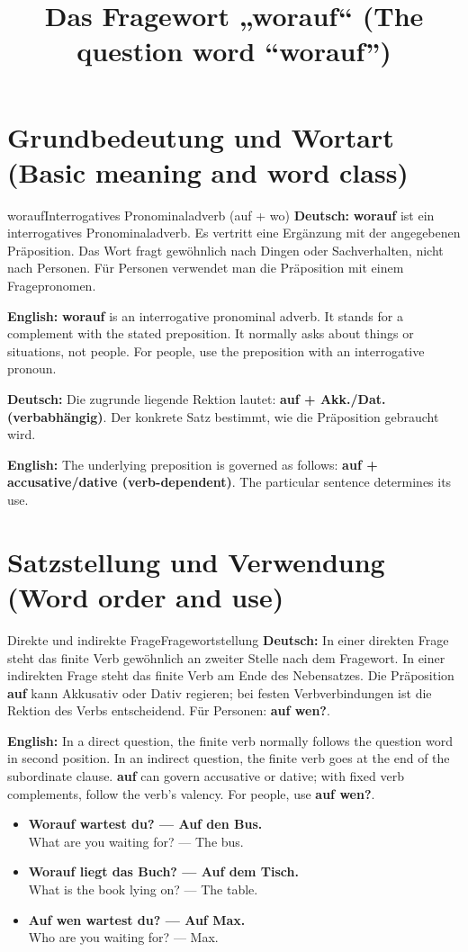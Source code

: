 \documentclass[a4paper,11pt]{article}
\title{Das Fragewort „worauf“ (The question word “worauf”)}
\date{}
\newcommand{\GermanText}[1]{\textbf{Deutsch: }#1\par}
\newcommand{\EnglishText}[1]{{\small\color{SoftGray}\textbf{English: }#1\par}}
\newcommand{\ExampleItem}[2]{\item \textbf{#1}\\{\small\color{SoftGray}#2}}
\begin{document}
\maketitle
\tableofcontents
\newpage
\section{Grundbedeutung und Wortart (Basic meaning and word class)}
\begin{grammarentry}{worauf}{Interrogatives Pronominaladverb (auf + wo)}
\GermanText{\textbf{worauf} ist ein interrogatives Pronominaladverb. Es vertritt eine Ergänzung mit der angegebenen Präposition. Das Wort fragt gewöhnlich nach Dingen oder Sachverhalten, nicht nach Personen. Für Personen verwendet man die Präposition mit einem Fragepronomen.}
\EnglishText{\textbf{worauf} is an interrogative pronominal adverb. It stands for a complement with the stated preposition. It normally asks about things or situations, not people. For people, use the preposition with an interrogative pronoun.}
\GermanText{Die zugrunde liegende Rektion lautet: \textbf{auf + Akk./Dat. (verbabhängig)}. Der konkrete Satz bestimmt, wie die Präposition gebraucht wird.}
\EnglishText{The underlying preposition is governed as follows: \textbf{auf + accusative/dative (verb-dependent)}. The particular sentence determines its use.}
\end{grammarentry}
\section{Satzstellung und Verwendung (Word order and use)}
\begin{grammarentry}{Direkte und indirekte Frage}{Fragewortstellung}
\GermanText{In einer direkten Frage steht das finite Verb gewöhnlich an zweiter Stelle nach dem Fragewort. In einer indirekten Frage steht das finite Verb am Ende des Nebensatzes. Die Präposition \textbf{auf} kann Akkusativ oder Dativ regieren; bei festen Verbverbindungen ist die Rektion des Verbs entscheidend. Für Personen: \textbf{auf wen?}.}
\EnglishText{In a direct question, the finite verb normally follows the question word in second position. In an indirect question, the finite verb goes at the end of the subordinate clause. \textbf{auf} can govern accusative or dative; with fixed verb complements, follow the verb's valency. For people, use \textbf{auf wen?}.}
\end{grammarentry}
\begin{exbox}\begin{itemize}
\ExampleItem{Worauf wartest du? — Auf den Bus.}{What are you waiting for? — The bus.}
\ExampleItem{Worauf liegt das Buch? — Auf dem Tisch.}{What is the book lying on? — The table.}
\ExampleItem{Auf wen wartest du? — Auf Max.}{Who are you waiting for? — Max.}
\end{itemize}\end{exbox}
\end{document}

